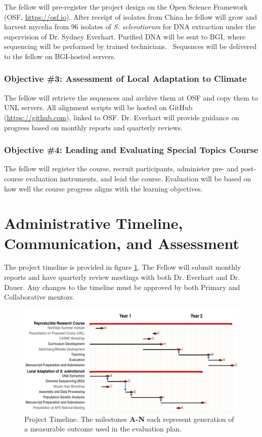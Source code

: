 \documentclass[12pt,letterpaper]{article}
\begin{document}
The fellow will pre-register the project design on the Open Science Framework (OSF, \url{https://osf.io}).
After receipt of isolates from China he fellow will grow and harvest mycelia from 96 isolates of \textit{S. sclerotiorum} for DNA extraction under the supervision of Dr. Sydney Everhart. 
Purified DNA will be sent to BGI, where sequencing will be performed by trained technicians. \
Sequences will be delivered to the fellow on BGI-hosted servers.

\subsubsection*{Objective \#3: Assessment of Local Adaptation to Climate}

The fellow will retrieve the sequences and archive them at OSF and copy them to UNL servers. 
All alignment scripts will be hosted on GitHub (\url{https://github.com}), linked to OSF. Dr. 
Everhart will provide guidance on progress based on monthly reports and quarterly reviews.

\subsubsection*{Objective \#4: Leading and Evaluating Special Topics Course}

The fellow will register the course, recruit participants, administer pre- and post- course evaluation instruments, and lead the course. 
Evaluation will be based on how well the course progress aligns with the learning objectives. 

\section{Administrative Timeline, Communication, and Assessment}

The project timeline is provided in figure \ref{fig:timeline}. 
The Fellow will submit monthly reports and have quarterly review meetings with both Dr. Everhart and Dr. Dauer. 
Any changes to the timeline must be approved by both Primary and Collaborative mentors. 

\begin{figure}[!htbp]
  \centering
  \includegraphics[width=\textwidth]{packet/timeline.pdf}
  \caption{Project Timeline. The milestones \textbf{A-N} each represent generation of a measurable outcome used in the evaluation plan.}
  \label{fig:timeline}
\end{figure}
\end{document}
